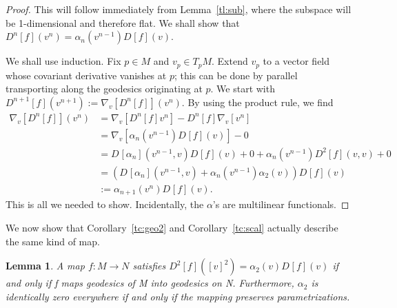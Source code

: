 \documentclass[11pt]{article}
\newtheorem{lemma}{Lemma}
\theoremstyle{remark}
\begin{document}
\begin{proof}
This will follow immediately from Lemma~\ref{tl:sub}, where the subspace
will be 1-dimensional and therefore flat. We shall show that 
$\ensuremath{D^{n} [{f}] ({v^n}) } = \alpha_n(v^{n-1}) \ensuremath{D^{} [{f}] ({v}) }$.


We shall use induction. Fix $p\in M$ and $v_p \in \ensuremath{T_p M}$. 
Extend $v_p$ to a vector
field whose covariant derivative vanishes at $p$; this can be done by
parallel transporting along the geodesics originating at $p$. 
We start with  $\ensuremath{D^{n+1} [{f}] ({v^{n+1}}) } \ensuremath{:=}
\ensuremath{{{\nabla}}_{v}^{}{[\ensuremath{D^{n} [{f}] {} }]}}(v^n)$. 
By  using the product rule, we find
\begin{align*}
\ensuremath{{{\nabla}}_{v}^{}{[\ensuremath{D^{n} [{f}] {} }]}}(v^n) 
& = \ensuremath{{{\nabla}}_{v}^{}{[\ensuremath{D^{n} [{f}] {v^n} }]}} - 
\ensuremath{D^{n} [{f}] {\ensuremath{{{\nabla}}_{v}^{}{[v^n]}}} } \\
& = \ensuremath{{{\nabla}}_{v}^{}{[\alpha_n(v^{n-1}) \ensuremath{D^{} [{f}] ({v}) }]}} - 0 \\
& = \ensuremath{D^{} [{\alpha_n}] ({v^{n-1}, v}) } \ensuremath{D^{} [{f}] ({v}) }  + 0 
+ \alpha_n(v^{n-1}) \ensuremath{D^{2} [{f}] ({v,v}) } +0 \\
&= ( \ensuremath{D^{} [{\alpha_n}] ({v^{n-1}, v}) } + \alpha_n(v^{n-1})
\alpha_2(v))  \ensuremath{D^{} [{f}] ({v}) } \\
& \ensuremath{:=} \alpha_{n+1} (v^n) \ensuremath{D^{} [{f}] ({v}) }.
\end{align*}
This is all we needed to show. Incidentally, the $\alpha$'s are
multilinear functionals. 
\end{proof}

We now show that Corollary~\ref{tc:geo2} and Corollary~\ref{tc:scal} actually
describe the same kind of map. 

\begin{lemma} \cite{EL83}
A map $f: M \to N$ satisfies 
$\ensuremath{D^{2} [{f}] ({[v]^2}) } = \alpha_2(v)\ensuremath{D^{} [{f}] ({v}) }$ if and only if f maps
geodesics of M into geodesics on N. Furthermore,  $\alpha_2$ is
identically zero everywhere if and only if the mapping preserves
parametrizations.  
\end{lemma}
\end{document}
